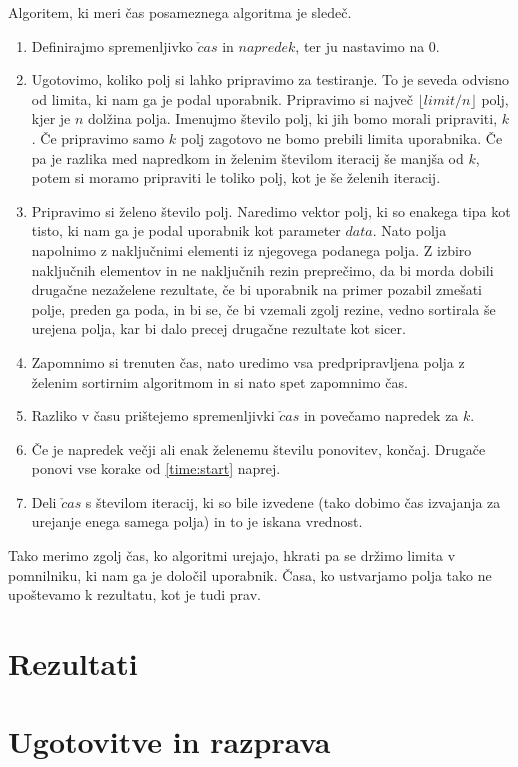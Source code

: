 \documentclass[a4paper,oneside,10pt]{article}
\begin{document}
Algoritem, ki meri čas posameznega algoritma je sledeč.
\begin{enumerate}
  \item Definirajmo spremenljivko $\check{c}as$ in $napredek$, ter ju nastavimo na 0.
  \item \label{time:start} Ugotovimo, koliko polj si lahko pripravimo za testiranje. To je seveda odvisno od
    limita, ki nam ga je podal uporabnik. Pripravimo si največ $\lfloor limit/n \rfloor$
    polj, kjer je $n$ dolžina polja. Imenujmo število polj, ki jih bomo morali pripraviti, $k$.
    Če pripravimo samo $k$ polj zagotovo ne bomo prebili limita uporabnika.
    Če pa je razlika med napredkom in želenim številom iteracij še manjša
    od $k$, potem si  moramo pripraviti le toliko polj, kot je še želenih iteracij.
  \item Pripravimo si želeno število polj. Naredimo vektor polj, ki so enakega tipa
     kot tisto, ki nam ga je podal uporabnik kot parameter $data$. Nato polja napolnimo z
     naključnimi elementi iz njegovega podanega polja. Z izbiro naključnih elementov in ne 
     naključnih rezin preprečimo, da bi morda dobili drugačne nezaželene rezultate, če bi
     uporabnik na primer pozabil zmešati polje, preden ga poda, in bi se, če bi vzemali 
     zgolj rezine, vedno sortirala še urejena polja, kar bi dalo precej drugačne rezultate 
     kot sicer.
  \item Zapomnimo si trenuten čas, nato uredimo vsa predpripravljena polja z želenim
     sortirnim algoritmom in si nato spet zapomnimo čas.
  \item Razliko v času prištejemo spremenljivki $\check{c}as$ in povečamo napredek za $k$. 
  \item Če je napredek večji ali enak želenemu številu ponovitev, končaj. 
    Drugače ponovi vse korake od \ref{time:start} naprej.
  \item Deli $\check{c}as$ s številom iteracij, ki so bile izvedene (tako dobimo čas
    izvajanja za urejanje enega samega polja) in to je iskana vrednost.
\end{enumerate}

Tako merimo zgolj čas, ko algoritmi urejajo, hkrati pa se držimo limita v pomnilniku, ki
nam ga je določil uporabnik. Časa, ko ustvarjamo polja tako ne upoštevamo k rezultatu, kot
je tudi prav.

\section{Rezultati}
\section{Ugotovitve in razprava}
\end{document}
